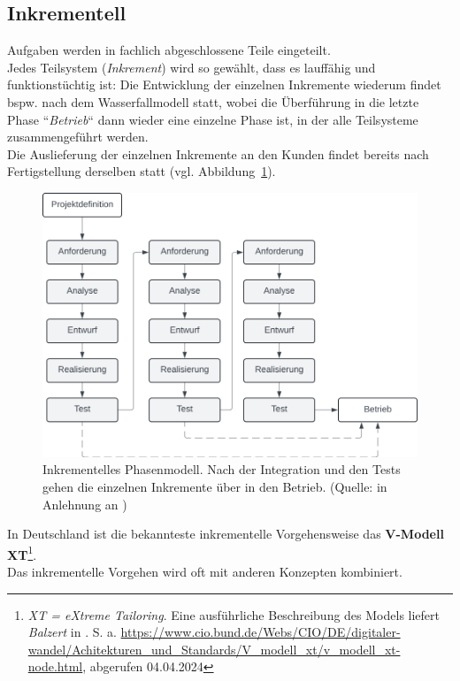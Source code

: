 
\subsection{Inkrementell}
Aufgaben werden in fachlich abgeschlossene Teile eingeteilt.\\
Jedes Teilsystem (\textit{Inkrement}) wird so gewählt, dass es lauffähig und funktionstüchtig ist: Die Entwicklung der einzelnen Inkremente wiederum findet bspw. nach dem Wasserfallmodell statt,
wobei die Überführung in die letzte Phase ``\textit{Betrieb}`` dann wieder eine einzelne Phase ist, in der alle Teilsysteme zusammengeführt werden.\\
Die Auslieferung der einzelnen Inkremente an den Kunden findet bereits nach Fertigstellung derselben statt (vgl. Abbildung~\ref{fig:inkrementell}).\\

\begin{figure}
    \centering
    \includegraphics[scale=0.4]{chapters/Prozessmodelle/img/inkrementell}
    \caption{Inkrementelles Phasenmodell.
    Nach der Integration und den Tests gehen die einzelnen Inkremente über in den Betrieb.
        (Quelle: in Anlehnung an \cite[322]{AABG14n})}
    \label{fig:inkrementell}
\end{figure}

\noindent
In Deutschland ist die bekannteste inkrementelle Vorgehensweise das \textbf{V-Modell XT}\footnote{ \textit{XT = eXtreme Tailoring}.
Eine ausführliche Beschreibung des Models liefert \textit{Balzert} in \cite{Bal08}. S. a.
\url{https://www.cio.bund.de/Webs/CIO/DE/digitaler-wandel/Achitekturen_und_Standards/V_modell_xt/v_modell_xt-node.html}, abgerufen 04.04.2024
}.\\
Das inkrementelle Vorgehen wird oft mit anderen Konzepten kombiniert.

